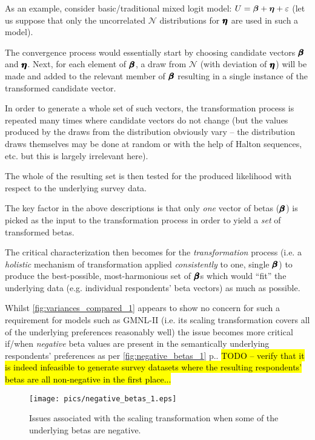 \documentclass[12pt,a4paper]{article}
\begin{document}
As an example, consider basic/traditional mixed logit model: \(U=\hm{\beta}+\hm{\eta} + \varepsilon\) (let us suppose that only the uncorrelated \(\mathcal{N}\) distributions for \(\pmb{\hm{\eta}}\) are used in such a model).

The convergence process would essentially start by choosing candidate vectors \(\pmb{\hm{\beta}}\) and \(\pmb{\hm{\eta}}\). Next, for each element of \(\pmb{\hm{\beta}}\), a draw from \(\mathcal{N}\) (with deviation of \(\pmb{\hm{\eta}}\)) will be made and added to the relevant member of \(\pmb{\hm{\beta}}\) resulting in a single instance of the transformed candidate vector. 

In order to generate a whole set of such vectors, the transformation process is repeated many times where candidate vectors do not change (but the values produced by the draws from the distribution obviously vary -- the distribution draws themselves may be done at random or with the help of Halton sequences, etc. but this is largely irrelevant here).

The whole of the resulting set is then tested for the produced likelihood with respect to the underlying survey data.

The key factor in the above descriptions is that only \textit{one} vector of betas (\(\pmb{\hm{\beta}}\)) is picked as the input to the transformation process in order to yield a \textit{set} of transformed betas.

The critical characterization then becomes for the \textit{transformation} process (i.e. a \textit{holistic} mechanism of transformation applied \textit{consistently} to one, single \(\pmb{\hm{\beta}}\)) to produce the best-possible, most-harmonious set of \(\pmb{\hm{\beta}}\)s which would ``fit'' the underlying data (e.g. individual respondents' beta vectors) as much as possible.

Whilst \autoref{fig:variances_compared_1} appears to show no concern for such a requirement for models such as GMNL-II (i.e. its scaling transformation covers all of the underlying preferences reasonably well) the issue becomes more critical if/when \textit{negative} beta values are present in the semantically underlying respondents' preferences as per \autoref{fig:negative_betas_1} p.\pageref{fig:negative_betas_1}. \hl{TODO -- verify that it is indeed infeasible to generate survey datasets where the resulting respondents' betas are all non-negative in the first place...}


\begin{figure}[H]
\begin{framed}
\texttt{[image: pics/negative\_betas\_1.eps]}


\caption{Issues associated with the scaling transformation when some of the underlying betas are negative.} 

\label{fig:negative_betas_1}
\end{framed}
\end{figure}
\end{document}
